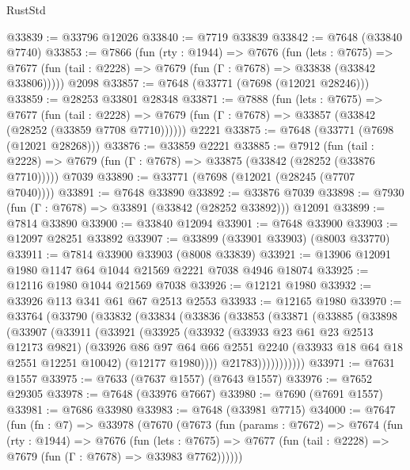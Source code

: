 \begin{lexlean}{RustStd}
\begin{coremodule}
{\begin{coremodule}
{{{{{{{{{{{{{{{{{{{{{{{{{{{{{{{{{{{{{{{{{{{{{{{{{{{{{@33839 := @33796 @12026
@33840 := @7719 @33839
@33842 := @7648 (@33840 @7740)
@33853 := @7866
    (fun (rty : @1944) =>
    @7676
      (fun (lets : @7675) =>
      @7677 (fun (tail : @2228) => @7679 (fun (Γ : @7678) => @33838 (@33842 @33806)))))
    @2098
@33857 := @7648 (@33771 (@7698 (@12021 @28246)))
@33859 := @28253 @33801 @28348
@33871 := @7888
    (fun (lets : @7675) =>
    @7677
      (fun (tail : @2228) =>
      @7679 (fun (Γ : @7678) => @33857 (@33842 (@28252 (@33859 @7708 @7710))))))
    @2221
@33875 := @7648 (@33771 (@7698 (@12021 @28268)))
@33876 := @33859 @2221
@33885 := @7912
    (fun (tail : @2228) => @7679 (fun (Γ : @7678) => @33875 (@33842 (@28252 (@33876 @7710)))))
    @7039
@33890 := @33771 (@7698 (@12021 (@28245 (@7707 @7040))))
@33891 := @7648 @33890
@33892 := @33876 @7039
@33898 := @7930 (fun (Γ : @7678) => @33891 (@33842 (@28252 @33892))) @12091
@33899 := @7814 @33890
@33900 := @33840 @12094
@33901 := @7648 @33900
@33903 := @12097 @28251 @33892
@33907 := @33899 (@33901 @33903) (@8003 @33770)
@33911 := @7814 @33900 @33903 (@8008 @33839)
@33921 := @13906 @12091 @1980 @1147 @64 @1044 @21569 @2221 @7038 @4946 @18074
@33925 := @12116 @1980 @1044 @21569 @7038
@33926 := @12121 @1980
@33932 := @33926 @113 @341 @61 @67 @2513 @2553
@33933 := @12165 @1980
@33970 := @33764
    (@33790
      (@33832
        (@33834
          (@33836
            (@33853
              (@33871
                (@33885
                  (@33898
                    (@33907
                      (@33911
                        (@33921
                          (@33925
                            (@33932
                              (@33933 @23 @61 @23 @2513 @12173 @9821)
                              (@33926
                                @86
                                @97
                                @64
                                @66
                                @2551
                                @2240
                                (@33933 @18 @64 @18 @2551 @12251 @10042)
                                (@12177 @1980))))
                          @21783)))))))))))
@33971 := @7631 @1557
@33975 := @7633 (@7637 @1557) (@7643 @1557)
@33976 := @7652 @29305
@33978 := @7648 (@33976 @7667)
@33980 := @7690 (@7691 @1557)
@33981 := @7686 @33980
@33983 := @7648 (@33981 @7715)
@34000 := @7647
    (fun (fn : @7) =>
    @33978
      (@7670
        (@7673
          (fun (params : @7672) =>
          @7674
            (fun (rty : @1944) =>
            @7676
              (fun (lets : @7675) =>
              @7677 (fun (tail : @2228) => @7679 (fun (Γ : @7678) => @33983 @7762))))))
}}}}}}}}}}}}}}}}}}}}}}}}}}}}}}}}}}}}}}}}}}}}}}}}}}}}}
\end{coremodule}}
\end{coremodule}
\end{lexlean}
